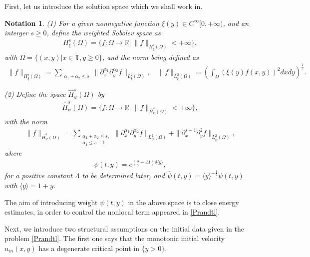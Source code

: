 \documentclass{amsart}
\numberwithin{equation}{section}
\newtheorem{notation}{Notation}[section]
\newcommand\y{{{\langle y \rangle}}}
\begin{document}
First, let us introduce the solution space which we shall work in.
\begin{notation} (1)
For a given nonnegative function $\xi(y)\in C^{\infty}[0,+\infty)$, and an interger $s\ge 0$, define the weighted Sobolev space as
\begin{align*}
H_{\xi}^{s}(\Omega)=\{f:\Omega\to\mathbb{R}|~\|f\|_{H_{\xi}^{s}(\Omega)}<+\infty\},
\end{align*}
with $\Omega=\{(x,y)| x\in\mathbb{T}, y\ge 0\}$, and the norm being defined as
\begin{align*}
\|f\|_{H_{\xi}^{s}(\Omega)}
=\sum_{\substack{\alpha_{1}+\alpha_{2}\leq s}}\|\partial_{x}^{\alpha_{1}}\partial_{y}^{\alpha_{2}}f\|_{L_{\xi}^{2}(\Omega)}, \quad
\|f\|_{L_{\xi}^{2}(\Omega)}=\left(\int_{\Omega}(\xi(y)f(x,y))^{2}dxdy\right)^{\frac{1}{2}}.
\end{align*}
	
(2) Define the space $\hat{H}_{\psi}^{s}(\Omega)$ by
\begin{align*}
\hat{H}_{\psi}^{s}(\Omega)=\{f:\Omega\to\mathbb{R}|~\|f\|_{\hat{H}_{\psi}^{s}(\Omega)}<+\infty\},
\end{align*}
with the norm
\begin{align}\label{cn}
\|f\|_{\hat{H}_{\psi}^{s}(\Omega)}
= \sum_{\substack{\alpha_{1}+\alpha_{2}\leq s,\\ \alpha_{1}\leq s-1}}\|\partial_{x}^{\alpha_{1}}\partial_{y}^{\alpha_{2}}f\|_{L_{\psi}^{2}(\Omega)}
 +\|\partial_{x}^{s-1}\partial_{y}^{2}f\|_{L_{\hat{\psi}}^{2}(\Omega)},
\end{align}
where
\begin{align}\label{psi}
\psi(t,y)=e^{(\frac{3}{4}-\Lambda t)\delta\y},
\end{align}
for a positive constant $\Lambda$ to be determined later, and $\hat{\psi}(t,y)=\y^{-\frac{1}{2}}\psi(t,y)$ with $\y=1+y$.
	
\end{notation}

The aim of introducing weight $\psi(t,y)$ in the above space is to close energy estimates, in order to control the nonlocal term appeared in  \eqref{Prandtl}.


Next, we introduce two structural assumptions on the initial data  given in the problem \eqref{Prandtl}. The first one says that the monotonic initial velocity $u_{in}(x,y)$ has a degenerate critical point in $\{y>0\}$.
\end{document}
